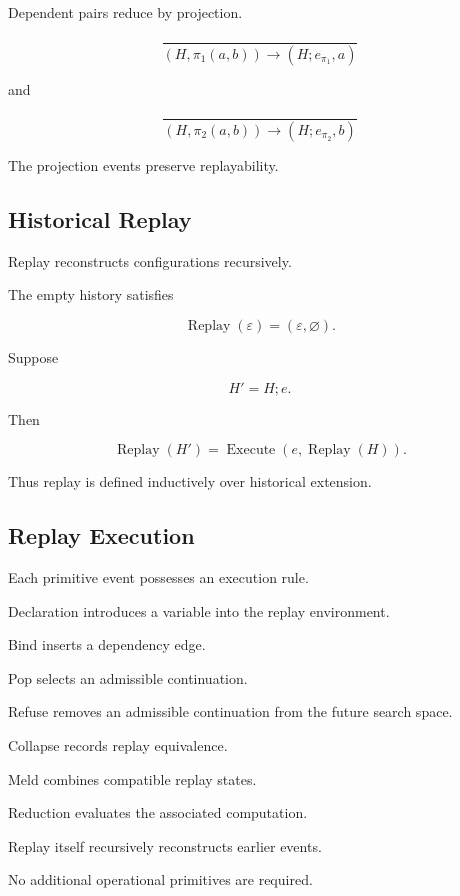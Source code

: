 \documentclass[12pt,oneside]{article}
\theoremstyle{definition}
\theoremstyle{remark}
\DeclareMathOperator{\Replay}{Replay}
\begin{document}
Dependent pairs reduce by projection.

\[
\frac{}{
(H,\pi_1(a,b))
\rightarrow
(H;e_{\pi_1},a)
}
\]

and

\[
\frac{}{
(H,\pi_2(a,b))
\rightarrow
(H;e_{\pi_2},b)
}
\]

The projection events preserve replayability.


\subsection{Historical Replay}

Replay reconstructs configurations recursively.

The empty history satisfies

\[
\Replay(\varepsilon)
=
(\varepsilon,\varnothing).
\]

Suppose

\[
H'
=
H;e.
\]

Then

\[
\Replay(H')
=
\operatorname{Execute}
(
e,
\Replay(H)
).
\]

Thus replay is defined inductively over historical extension.


\subsection{Replay Execution}

Each primitive event possesses an execution rule.

Declaration introduces a variable into the replay environment.

Bind inserts a dependency edge.

Pop selects an admissible continuation.

Refuse removes an admissible continuation from the future search space.

Collapse records replay equivalence.

Meld combines compatible replay states.

Reduction evaluates the associated computation.

Replay itself recursively reconstructs earlier events.

No additional operational primitives are required.

\end{document}
